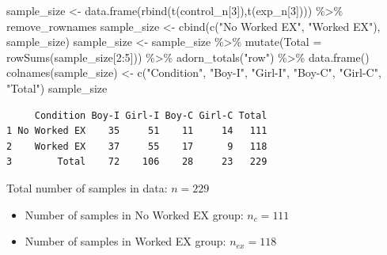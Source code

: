 \documentclass[
  letterpaper,
  DIV=11,
  numbers=noendperiod]{scrartcl}
\newenvironment{Shaded}{\begin{snugshade}}{\end{snugshade}}
\newcommand{\AttributeTok}[1]{\textcolor[rgb]{0.49,0.56,0.16}{#1}}
\newcommand{\DecValTok}[1]{\textcolor[rgb]{0.25,0.63,0.44}{#1}}
\newcommand{\FunctionTok}[1]{\textcolor[rgb]{0.02,0.16,0.49}{#1}}
\newcommand{\NormalTok}[1]{\textcolor[rgb]{0.00,0.44,0.13}{#1}}
\newcommand{\OtherTok}[1]{\textcolor[rgb]{0.00,0.44,0.13}{#1}}
\newcommand{\SpecialCharTok}[1]{\textcolor[rgb]{0.25,0.44,0.63}{#1}}
\newcommand{\StringTok}[1]{\textcolor[rgb]{0.25,0.44,0.63}{#1}}
\providecommand{\tightlist}{%
  \setlength{\itemsep}{0pt}\setlength{\parskip}{0pt}}\usepackage{longtable,booktabs,array}
\begin{document}
\begin{Shaded}
\begin{Highlighting}[]
\NormalTok{sample\_size }\OtherTok{\textless{}{-}} \FunctionTok{data.frame}\NormalTok{(}\FunctionTok{rbind}\NormalTok{(}\FunctionTok{t}\NormalTok{(control\_n[}\DecValTok{3}\NormalTok{]),}\FunctionTok{t}\NormalTok{(exp\_n[}\DecValTok{3}\NormalTok{]))) }\SpecialCharTok{\%\textgreater{}\%}\NormalTok{ remove\_rownames }
\NormalTok{sample\_size }\OtherTok{\textless{}{-}} \FunctionTok{cbind}\NormalTok{(}\FunctionTok{c}\NormalTok{(}\StringTok{"No Worked EX"}\NormalTok{, }\StringTok{"Worked EX"}\NormalTok{), sample\_size)}
\NormalTok{sample\_size }\OtherTok{\textless{}{-}}\NormalTok{ sample\_size }\SpecialCharTok{\%\textgreater{}\%} \FunctionTok{mutate}\NormalTok{(}\AttributeTok{Total =}  \FunctionTok{rowSums}\NormalTok{(sample\_size[}\DecValTok{2}\SpecialCharTok{:}\DecValTok{5}\NormalTok{])) }\SpecialCharTok{\%\textgreater{}\%} 
  \FunctionTok{adorn\_totals}\NormalTok{(}\StringTok{"row"}\NormalTok{) }\SpecialCharTok{\%\textgreater{}\%} \FunctionTok{data.frame}\NormalTok{()}
\FunctionTok{colnames}\NormalTok{(sample\_size) }\OtherTok{\textless{}{-}} \FunctionTok{c}\NormalTok{(}\StringTok{"Condition"}\NormalTok{, }\StringTok{"Boy{-}I"}\NormalTok{, }\StringTok{"Girl{-}I"}\NormalTok{, }\StringTok{"Boy{-}C"}\NormalTok{, }\StringTok{"Girl{-}C"}\NormalTok{, }\StringTok{"Total"}\NormalTok{)}
\NormalTok{sample\_size}
\end{Highlighting}
\end{Shaded}

\begin{verbatim}
     Condition Boy-I Girl-I Boy-C Girl-C Total
1 No Worked EX    35     51    11     14   111
2    Worked EX    37     55    17      9   118
3        Total    72    106    28     23   229
\end{verbatim}

Total number of samples in data: \(n = 229\)

\begin{itemize}
\tightlist
\item
  Number of samples in No Worked EX group: \(n_{c} = 111\)
\item
  Number of samples in Worked EX group: \(n_{ex} = 118\)
\end{itemize}
\end{document}
